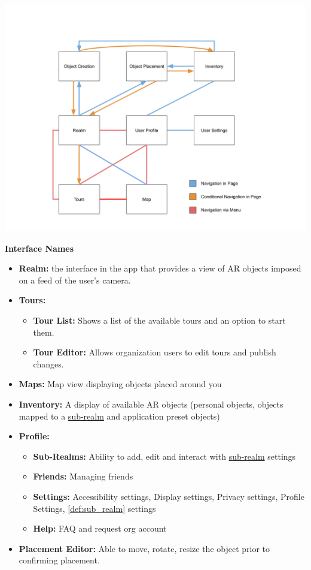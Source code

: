 \documentclass{article}
\begin{document}
\begin{center}
    \includegraphics[scale=0.4]{OtherDiagrams/ui_flow.png}
\end{center}

\textbf{Interface Names}
\begin{itemize}
    \item \textbf{Realm:} the interface in the app that provides a view of AR objects imposed on a feed of the user’s camera.
    \item \textbf{Tours:}
          \begin{itemize}
              \item \textbf{Tour List:} Shows a list of the available tours and an option to start them.
              \item \textbf{Tour Editor:} Allows organization users to edit tours and publish changes.
          \end{itemize}
    \item \textbf{Maps:} Map view displaying objects placed around you
    \item \textbf{Inventory:} A display of available AR objects (personal objects, objects mapped to a \hyperref[def:sub_realm]{sub-realm} and application preset objects)
    \item \textbf{Profile:}
          \begin{itemize}
              \item \textbf{Sub-Realms:} Ability to add, edit and interact with \hyperref[def:sub_realm]{sub-realm} settings
              \item \textbf{Friends:} Managing friends
              \item \textbf{Settings:} Accessibility settings, Display settings, Privacy settings, Profile Settings, \ref{def:sub_realm} settings
              \item \textbf{Help:} FAQ and request org account
          \end{itemize}
    \item \textbf{Placement Editor:} Able to move, rotate, resize the object prior to confirming placement.
\end{itemize}
\end{document}
